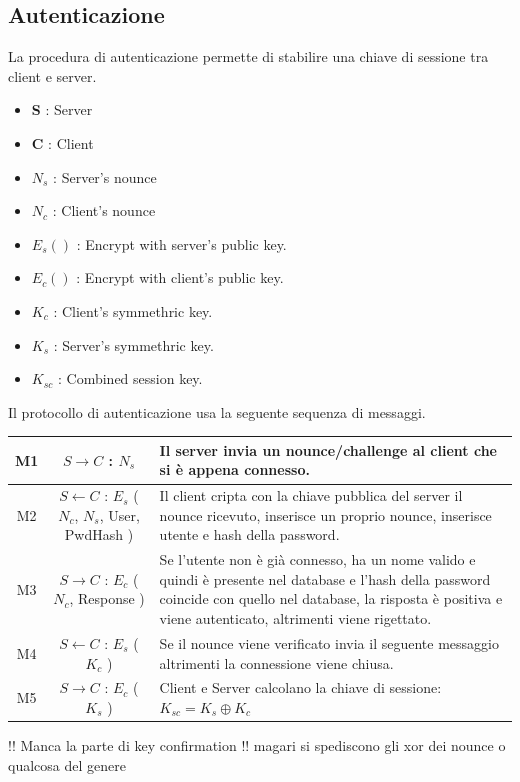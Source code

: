 \documentclass[a4paper,titlepage]{article}
\begin{document}
\subsection{Autenticazione}
La procedura di autenticazione permette di stabilire una chiave di sessione tra client e server.
\begin{itemize}
\item \textbf{S} : Server
\item \textbf{C} : Client
\item $N_s$ : Server's nounce
\item $N_c$ : Client's nounce
\item $E_{s} ()$ : Encrypt with server's public key. 
\item $E_{c} ()$ : Encrypt with client's public key.
\item $K_c$ : Client's symmethric key.
\item $K_s$ : Server's symmethric key.
\item $K_{sc}$ : Combined session key.
\end{itemize}
Il protocollo di autenticazione usa la seguente sequenza di messaggi.
\begin{center}
    \begin{tabular}{ | c | c | p{6cm} |}
    \hline
    M1 & $S \rightarrow C$ : $N_s$ & Il server invia un nounce/challenge al client che si è appena connesso. \\ \hline
    M2 & $S \leftarrow C$ : $E_{s}$ ( $N_c$, $N_s$, User, PwdHash ) & Il client cripta con la chiave pubblica del server il nounce ricevuto, inserisce un proprio nounce, inserisce utente e hash della password. \\ \hline
    M3 & $S \rightarrow C$ : $E_{c}$ ( $N_c$, Response ) & Se l'utente non è già connesso, ha un nome valido e quindi è presente nel database e l'hash della password coincide con quello nel database, la risposta è positiva e viene autenticato, altrimenti viene rigettato. \\ \hline
    M4 & $S \leftarrow C$ : $E_{s}$ ( $K_c$ ) & Se il nounce viene verificato invia il seguente messaggio altrimenti la connessione viene chiusa.\\ \hline
    M5 & $S \rightarrow C$ : $E_{c}$ ( $K_s$ ) & Client e Server calcolano la chiave di sessione: $ K_{sc} = K_s \oplus K_c $ \\ \hline
    \end{tabular}
\end{center}
!! Manca la parte di key confirmation !! magari si spediscono gli xor dei nounce o qualcosa del genere\\
\end{document}
